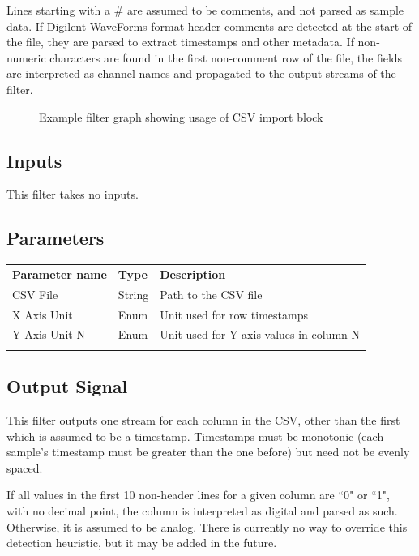 Lines starting with a \# are assumed to be comments, and not parsed as sample data. If Digilent WaveForms format header
comments are detected at the start of the file, they are parsed to extract timestamps and other metadata. If
non-numeric characters are found in the first non-comment row of the file, the fields are interpreted as channel names
and propagated to the output streams of the filter.

\begin{figure}[h]
\centering
{}
\caption{Example filter graph showing usage of CSV import block}
\label{filter_graph_csv_import}
\end{figure}

\subsection{Inputs}

This filter takes no inputs.

\subsection{Parameters}

\begin{tabularx}{16cm}{llX}
\thickhline
\textbf{Parameter name} & \textbf{Type} & \textbf{Description} \\
\thickhline
CSV File & String & Path to the CSV file\\
\thinhline
X Axis Unit & Enum & Unit used for row timestamps\\
\thinhline
Y Axis Unit N & Enum & Unit used for Y axis values in column N\\
\thickhline
\end{tabularx}

\subsection{Output Signal}

This filter outputs one stream for each column in the CSV, other than the first which is assumed to be a timestamp.
Timestamps must be monotonic (each sample's timestamp must be greater than the one before) but need not be evenly
spaced.

If all values in the first 10 non-header lines for a given column are ``0" or ``1", with no decimal point, the column
is interpreted as digital and parsed as such. Otherwise, it is assumed to be analog. There is currently no way to
override this detection heuristic, but it may be added in the future.

